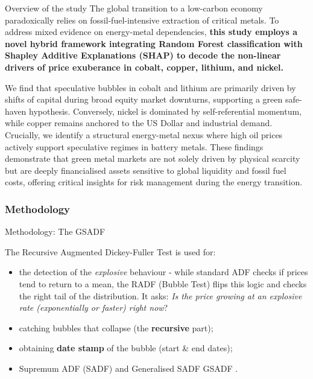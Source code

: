 \documentclass{beamer}
\begin{document}
\begin{frame}{Overview of the study}
    The global transition to a low-carbon economy paradoxically relies on fossil-fuel-intensive extraction of critical metals. To address mixed evidence on energy-metal dependencies, \textbf{this study employs a novel hybrid framework integrating Random Forest classification with Shapley Additive Explanations (SHAP) to decode the non-linear drivers of price exuberance in cobalt, copper, lithium, and nickel.} 
    
    We find that speculative bubbles in cobalt and lithium are primarily driven by shifts of capital during broad equity market downturns, supporting a green safe-haven hypothesis. Conversely, nickel is dominated by self-referential momentum, while copper remains anchored to the US Dollar and industrial demand. Crucially, we identify a structural energy-metal nexus where high oil prices actively support speculative regimes in battery metals. These findings demonstrate that green metal markets are not solely driven by physical scarcity but are deeply financialised assets sensitive to global liquidity and fossil fuel costs, offering critical insights for risk management during the energy transition.
\end{frame}








\begin{frame}[fragile]
  \frametitle{Methodology}

\end{frame}

\begin{frame}{Methodology: The GSADF}

The Recursive Augmented Dickey-Fuller Test is used for:
\begin{itemize}
    \item the detection of the \textit{explosive} behaviour - while 
    standard ADF checks if prices tend to return to a mean, the RADF (Bubble Test) flips this logic and checks the right tail of the distribution. It asks: \textit{Is the price growing at an explosive rate (exponentially or faster) right now}?
    \item catching bubbles that collapse (the \textbf{recursive} part);
    \item obtaining \textbf{date stamp} of the bubble (start \& end dates);
    \item Supremum ADF (SADF) \citep{Phillips2011} and Generalised SADF GSADF \citep{Phillips2015}.
\end{itemize}
 
 

\end{frame}
\end{document}

